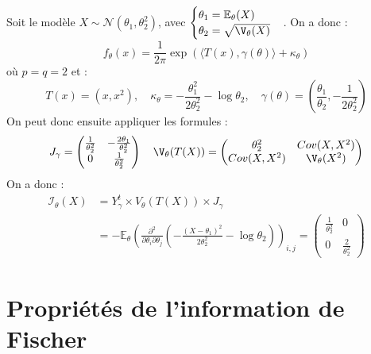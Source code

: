 \begin{example}
    Soit le modèle $X \sim \mathcal{N}( \theta_1, \theta_2^2)$, avec 
    $ 
        \begin{cases}
            \theta_1 = \mathbb{E}_\theta(X) \\
            \theta_2 = \sqrt{\V_\theta(X)}
        \end{cases}
    $. 
    On a donc : 
        $$ f_\theta(x) = \frac{1}{2 \pi} \exp \left( \langle T(x), \gamma(\theta) \rangle + \kappa_\theta\right) $$
    où $ p =q = 2$ et : 
        $$ 
            T(x) = (x, x^2), \quad \kappa_\theta = - \frac{ \theta_1^2}{2 \theta_2^2} - \log \theta_2, \quad 
            \gamma(\theta) = \left( \frac{ \theta_1}{ \theta_2}, - \frac{1}{ 2 \theta_2^2}\right) 
        $$
    On peut donc ensuite appliquer les formules : 
        $$ J_\gamma = 
            \begin{pmatrix}
                \frac{1}{ \theta_2^2} & - \frac{2 \theta_1}{ \theta_2^2} \\
                0 & \frac{1}{ \theta_2^2}
            \end{pmatrix}
            \quad \V_\theta(T(X)) = 
            \begin{pmatrix}
                \theta_2^2 & Cov(X, X^2) \\ 
                Cov(X, X^2) & \V_\theta(X^2)
            \end{pmatrix}
        $$ 
    On a donc : 
        \begin{align*}
            \mathcal{I}_\theta(X) &= Y_\gamma^t \times V_\theta(T(X)) \times J_\gamma \\ 
            &= - \mathbb{E}_\theta \left( \frac{\partial^2}{ \partial \theta_i \partial \theta_j} 
                \left(
                    - \frac{(X- \theta_1)^2}{2 \theta_2^2} - \log \theta_2
                \right)
                \right)_{i,j}
            = 
                \begin{pmatrix}
                    \frac{1}{ \theta_2^2} & 0 \\ 
                    0 & \frac{2}{ \theta_2^2}
                \end{pmatrix}
        \end{align*}
\end{example}


\section{Propriétés de l'information de Fischer}


